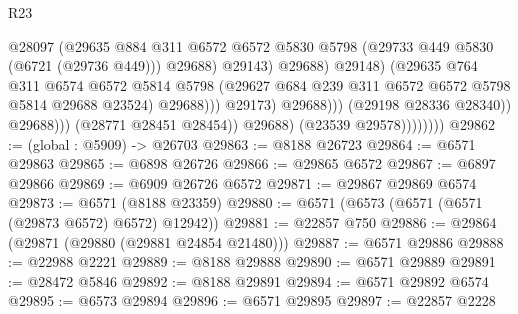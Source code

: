 \begin{lexlean}{R23}
\begin{coremodule}
                                                @28097
                                                (@29635
                                                  @884
                                                  @311
                                                  @6572
                                                  @6572
                                                  @5830
                                                  @5798
                                                  (@29733 @449 @5830 (@6721 (@29736 @449)))
                                                  @29688)
                                                @29143)
                                              @29688)
                                            @29148)
                                          (@29635
                                            @764
                                            @311
                                            @6574
                                            @6572
                                            @5814
                                            @5798
                                            (@29627
                                              @684
                                              @239
                                              @311
                                              @6572
                                              @6572
                                              @5798
                                              @5814
                                              @29688
                                              @23524)
                                            @29688)))
                                      @29173)
                                    @29688)))
                              (@29198 @28336 @28340))
                            @29688)))
                      (@28771 @28451 @28454))
                    @29688)
                  (@23539 @29578))))))))
@29862 := (global : @5909) -> @26703
@29863 := @8188 @26723
@29864 := @6571 @29863
@29865 := @6898 @26726
@29866 := @29865 @6572
@29867 := @6897 @29866
@29869 := @6909 @26726 @6572
@29871 := @29867 @29869 @6574
@29873 := @6571 (@8188 @23359)
@29880 := @6571 (@6573 (@6571 (@6571 (@29873 @6572) @6572) @12942))
@29881 := @22857 @750
@29886 := @29864 (@29871 (@29880 (@29881 @24854 @21480)))
@29887 := @6571 @29886
@29888 := @22988 @2221
@29889 := @8188 @29888
@29890 := @6571 @29889
@29891 := @28472 @5846
@29892 := @8188 @29891
@29894 := @6571 @29892 @6574
@29895 := @6573 @29894
@29896 := @6571 @29895
@29897 := @22857 @2228

\end{coremodule}
\end{lexlean}
